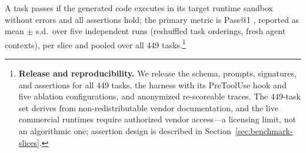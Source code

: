 A task passes if the generated code executes in its target runtime sandbox without errors and all assertions hold; the primary metric is Pass@1 \cite{chen2021evaluating}, reported as mean $\pm$ s.d.\ over five independent runs (reshuffled task orderings, fresh agent contexts), per slice and pooled over all 449 tasks.\footnote{\textbf{Release and reproducibility.} We release the schema, prompts, signatures, and assertions for all 449 tasks, the harness with its PreToolUse hook and five ablation configurations, and anonymized re-scoreable traces. The 449-task set derives from non-redistributable vendor documentation, and the live commercial runtimes require authorized vendor access---a licensing limit, not an algorithmic one; assertion design is described in Section~\ref{sec:benchmark-slices}.}
